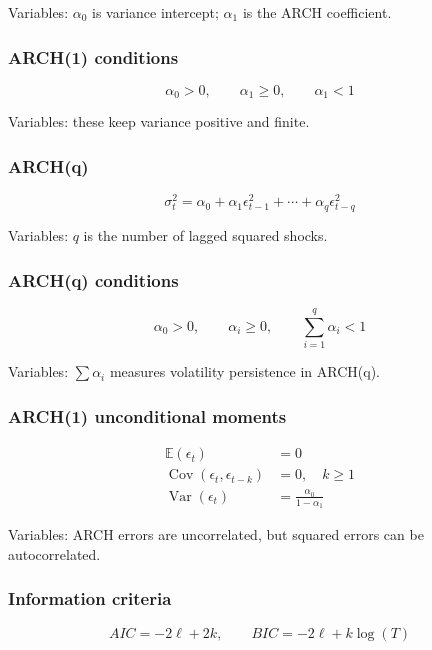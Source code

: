 \documentclass[
  8pt,
  twocolumn]{extarticle}
\begin{document}
Variables: \(\alpha_0\) is variance intercept; \(\alpha_1\) is the ARCH
coefficient.

\subsubsection{ARCH(1) conditions}\label{arch1-conditions}

\[
\alpha_0>0,\qquad \alpha_1\ge0,\qquad \alpha_1<1
\]

Variables: these keep variance positive and finite.

\subsubsection{ARCH(q)}\label{archq}

\[
\sigma_t^2=\alpha_0+\alpha_1\epsilon_{t-1}^2+\cdots+\alpha_q\epsilon_{t-q}^2
\]

Variables: \(q\) is the number of lagged squared shocks.

\subsubsection{ARCH(q) conditions}\label{archq-conditions}

\[
\alpha_0>0,\qquad \alpha_i\ge0,\qquad \sum_{i=1}^{q}\alpha_i<1
\]

Variables: \(\sum\alpha_i\) measures volatility persistence in ARCH(q).

\subsubsection{ARCH(1) unconditional
moments}\label{arch1-unconditional-moments}

\[
\begin{aligned}
\mathbb E(\epsilon_t)&=0\\
\operatorname{Cov}(\epsilon_t,\epsilon_{t-k})&=0,\quad k\ge1\\
\operatorname{Var}(\epsilon_t)&=\frac{\alpha_0}{1-\alpha_1}
\end{aligned}
\]

Variables: ARCH errors are uncorrelated, but squared errors can be
autocorrelated.

\subsubsection{Information criteria}\label{information-criteria}

\[
AIC=-2\ell+2k,\qquad BIC=-2\ell+k\log(T)
\]
\end{document}
